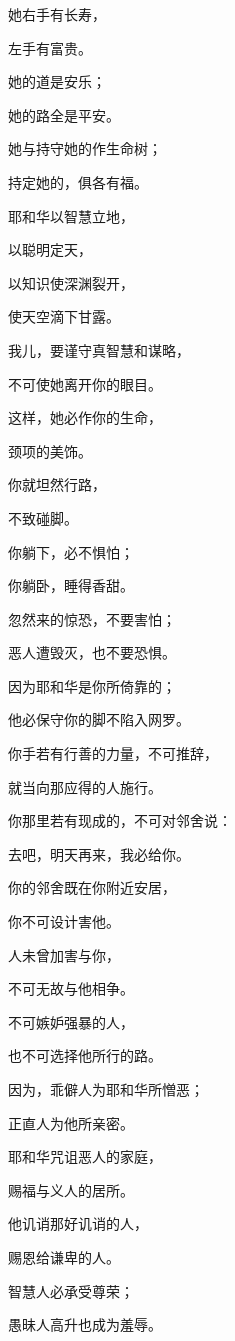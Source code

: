 {\par }{\Q {}她右手有长寿，
\par }{\Q 左手有富贵。
\par }{\Q {}她的道是安乐；
\par }{\Q 她的路全是平安。
\par }{\Q {}她与持守她的作生命树；
\par }{\Q 持定她的，俱各有福。
\par }{\Q {}耶和华以智慧立地，
\par }{\Q 以聪明定天，
\par }{\Q {}以知识使深渊裂开，
\par }{\Q 使天空滴下甘露。
\par }{\BB \par }{\Q {}我儿，要谨守真智慧和谋略，
\par }{\Q 不可使她离开你的眼目。
\par }{\Q {}这样，她必作你的生命，
\par }{\Q 颈项的美饰。
\par }{\Q {}你就坦然行路，
\par }{\Q 不致碰脚。
\par }{\Q {}你躺下，必不惧怕；
\par }{\Q 你躺卧，睡得香甜。
\par }{\Q {}忽然来的惊恐，不要害怕；
\par }{\Q 恶人遭毁灭，也不要恐惧。
\par }{\Q {}因为耶和华是你所倚靠的；
\par }{\Q 他必保守你的脚不陷入网罗。
\par }{\BB \par }{\Q {}你手若有行善的力量，不可推辞，
\par }{\Q 就当向那应得的人施行。
\par }{\Q {}你那里若有现成的，不可对邻舍说：
\par }{\Q 去吧，明天再来，我必给你。
\par }{\Q {}你的邻舍既在你附近安居，
\par }{\Q 你不可设计害他。
\par }{\Q {}人未曾加害与你，
\par }{\Q 不可无故与他相争。
\par }{\Q {}不可嫉妒强暴的人，
\par }{\Q 也不可选择他所行的路。
\par }{\Q {}因为，乖僻人为耶和华所憎恶；
\par }{\Q 正直人为他所亲密。
\par }{\Q {}耶和华咒诅恶人的家庭，
\par }{\Q 赐福与义人的居所。
\par }{\Q {}他讥诮那好讥诮的人，
\par }{\Q 赐恩给谦卑的人。
\par }{\Q {}智慧人必承受尊荣；
\par }{\Q 愚昧人高升也成为羞辱。

}
